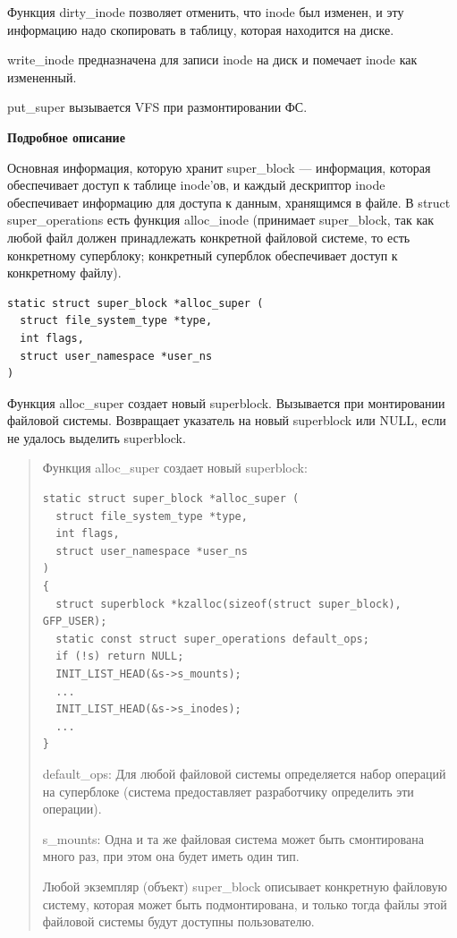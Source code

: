 Функция dirty\_inode позволяет отменить, что inode был изменен, и эту информацию надо скопировать в таблицу, которая находится на диске.

write\_inode предназначена для записи inode на диск и помечает inode как измененный.

put\_super вызывается VFS при размонтировании ФС.

\textbf{Подробное описание}

Основная информация, которую хранит super\_block — информация, которая обеспечивает доступ к таблице inode'ов, и каждый дескриптор inode обеспечивает информацию для доступа к данным, хранящимся в файле. В struct super\_operations есть функция alloc\_inode (принимает super\_block, так как любой файл должен принадлежать конкретной файловой системе, то есть конкретному суперблоку; конкретный суперблок обеспечивает доступ к конкретному файлу).

\begin{lstlisting}
static struct super_block *alloc_super (
  struct file_system_type *type,
  int flags,
  struct user_namespace *user_ns
)

\end{lstlisting}

Функция alloc\_super создает новый superblock. Вызывается при монтировании файловой системы. Возвращает указатель на новый superblock или NULL, если не удалось выделить superblock.

\begin{quote}

Функция alloc\_super создает новый superblock:

\begin{lstlisting}
static struct super_block *alloc_super (
  struct file_system_type *type,
  int flags,
  struct user_namespace *user_ns
)
{
  struct superblock *kzalloc(sizeof(struct super_block), GFP_USER);
  static const struct super_operations default_ops;
  if (!s) return NULL;
  INIT_LIST_HEAD(&s->s_mounts);
  ...
  INIT_LIST_HEAD(&s->s_inodes);
  ...
}
\end{lstlisting}

default\_ops: Для любой файловой системы определяется набор операций на суперблоке (система предоставляет разработчику определить эти операции).

s\_mounts: Одна и та же файловая система может быть смонтирована много раз, при этом она будет иметь один тип.

Любой экземпляр (объект) super\_block описывает конкретную файловую систему, которая может быть подмонтирована, и только тогда файлы этой файловой системы будут доступны пользователю.
\end{quote}

